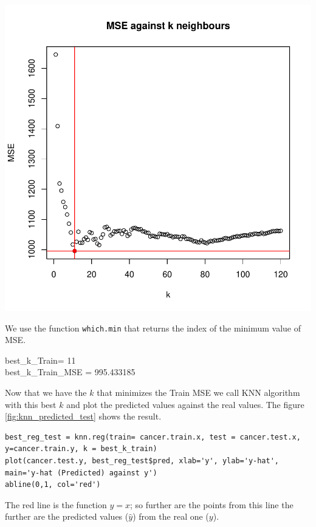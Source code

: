 \documentclass[]{report}
\begin{document}
\begin{center}	
		\includegraphics[width=0.9\linewidth]{Figures/knn_test.pdf}
		\label{fig:knn_train}
\end{center}

 We use the function \texttt{which.min} that returns the index of the minimum value of MSE.\\

\begin{center} 
	best\_k\_Train= 11 \\
	best\_k\_Train\_MSE = 995.433185
\end{center}

Now that we have the $k$ that minimizes the Train MSE we call KNN algorithm with this best $k$ and plot the predicted values against the real values. The figure \ref{fig:knn_predicted_test} shows the result.

\begin{lstlisting}
best_reg_test = knn.reg(train= cancer.train.x, test = cancer.test.x, y=cancer.train.y, k = best_k_train)
plot(cancer.test.y, best_reg_test$pred, xlab='y', ylab='y-hat', main='y-hat (Predicted) against y')
abline(0,1, col='red')
\end{lstlisting}

The red line is the function $y=x$; so further are the points from this line the further are the predicted values ($\hat{y}$) from the real one ($y$).
	
\end{document}
